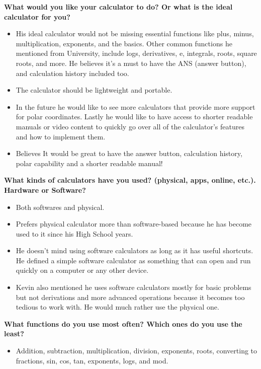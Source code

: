 \documentclass[a4paper]{article}
\begin{document}
\textbf{What would you like your calculator to do? Or what is the ideal calculator for you?}
\begin{itemize}
\itemsep0em 
\item His  ideal calculator would not be missing essential functions like plus, minus, multiplication, exponents, and the basics. Other common functions he mentioned from University, include logs, derivatives, e, integrals, roots, square roots, and more. He believes it’s a must to have the ANS (answer button), and calculation history included too. 
\item The calculator should be lightweight and portable. 
\item In the future he would like to see more calculators that provide more support for polar coordinates. Lastly he would like to have access to shorter readable manuals or video content to quickly go over all of the calculator’s features and how to implement them.
\item Believes It would be great to have the answer button, calculation history, polar capability and a shorter readable manual! 
\end{itemize}

\textbf{What kinds of calculators have you used? (physical, apps, online, etc.). Hardware or Software?}
\begin{itemize}
\itemsep0em 
\item Both softwares and physical.
\item Prefers physical calculator more than software-based because he has become used to it since his High School years. 
\item He doesn’t mind using software calculators as long as it has useful shortcuts. He defined a simple software calculator as something that can open and run quickly on a computer or any other device. 
\item Kevin also mentioned he uses software calculators mostly for basic problems but not derivations and more advanced operations because it becomes too tedious to work with. He would much rather use the physical one. 
\end{itemize}

\textbf{What functions do you use most often? Which ones do you use the least?}
\begin{itemize}
\itemsep0em 
\item Addition, subtraction, multiplication, division, exponents, roots, converting to fractions, sin, cos, tan, exponents, logs, and mod.
\end{itemize}
\end{document}
